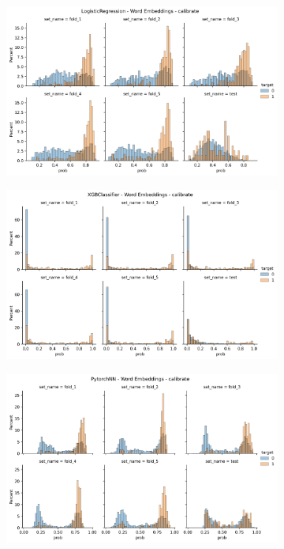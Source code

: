 \begin{figure}
    \centering
    \begin{subfigure}[b]{0.83\textwidth}
    \includegraphics[width=\linewidth]{figures/results/word_embeddings/lgr/calibrate/calibrate__distplot.png}
    \end{subfigure}
    \hfill
    \centering
    \begin{subfigure}[b]{0.83\textwidth}
        \centering
        \includegraphics[width=\linewidth]{figures/results/word_embeddings/xgboost/calibrate/calibrate__distplot.png}
    \end{subfigure}
    \hfill
    \centering
    \begin{subfigure}[b]{0.83\textwidth}
        \centering
        \includegraphics[width=\linewidth]{figures/results/word_embeddings/nn/calibrate/calibrate__distplot.png}

\end{subfigure}
\end{figure}
